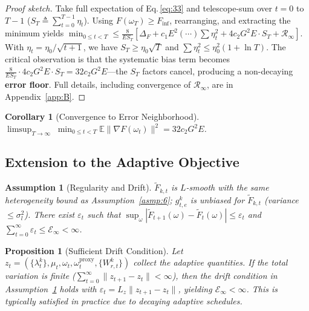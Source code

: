 \documentclass[journal]{IEEEtran}
\newtheorem{assumption}{Assumption}
\newtheorem{corollary}{Corollary}
\newtheorem{proposition}{Proposition}
\begin{document}
\begin{proof}[Proof sketch]
  Take full expectation of Eq.\,\eqref{eq:33} and telescope-sum over \(t = 0\) to \(T-1\) (\(S_T \triangleq \sum_{t=0}^{T-1}\eta_t\)).
  Using \(F(\omega_T) \ge F_{\inf}\), rearranging, and extracting the minimum yields
  \(\min_{0\le t<T} \le \frac{8}{E S_T}[\Delta_F + c_1 E^2(\cdots)\sum\eta_t^2 + 4c_2 G^2 E \cdot S_T + \mathcal R_\infty]\).
  With \(\eta_t = \eta_0/\sqrt{t+1}\), we have \(S_T \ge \eta_0\sqrt{T}\) and \(\sum\eta_t^2 \le \eta_0^2(1 + \ln T)\).
  The critical observation is that the systematic bias term becomes \(\frac{8}{E S_T}\cdot 4c_2 G^2 E \cdot S_T = 32 c_2 G^2 E\)---the \(S_T\) factors cancel, producing a non-decaying \textbf{error floor}.
  Full details, including convergence of \(\mathcal R_\infty\), are in Appendix~\ref{app:B}.
\end{proof}

\begin{corollary}[Convergence to Error Neighborhood]\label{cor:1}
  \(\displaystyle \limsup_{T\to\infty}\;\min_{0\le t<T} \mathbb E\|\nabla F(\omega_t)\|^2 = 32 c_2 G^2 E\).
\end{corollary}

\subsection{Extension to the Adaptive Objective}

\begin{assumption}[Regularity and Drift]\label{asmp:11}
  \(\widetilde F_{k,t}\) is \(L\)-smooth with the same heterogeneity bound as Assumption~\ref{asmp:6};
  \(g_{t,e}^k\) is unbiased for \(\widetilde F_{k,t}\) (variance \(\le \sigma_l^2\)).
  There exist \(\varepsilon_t\) such that
  \(\sup_\omega |\widetilde F_{t+1}(\omega) - \widetilde F_t(\omega)| \le \varepsilon_t\)
  and \(\sum_{t=0}^{\infty} \varepsilon_t \le \mathcal E_\infty < \infty\).
\end{assumption}

\begin{proposition}[Sufficient Drift Condition]\label{prop:6}
  Let \(z_t = (\{\lambda_t^k\}, \mu_t, \omega_t, \omega_t^{\mathrm{proxy}}, \{W_{r,t}^k\})\) collect the adaptive quantities.
  If the total variation is finite (\(\sum_{t=0}^{\infty}\|z_{t+1} - z_t\| < \infty\)),
  then the drift condition in Assumption~\ref{asmp:11} holds with
  \(\varepsilon_t = L_z\|z_{t+1} - z_t\|\), yielding \(\mathcal E_\infty < \infty\).
  This is typically satisfied in practice due to decaying adaptive schedules.
\end{proposition}
\end{document}
